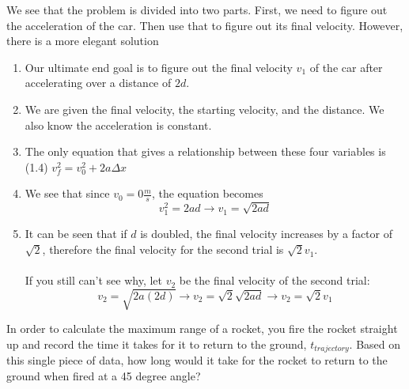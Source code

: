 \begin{solution}
We see that the problem is divided into two parts. First, we need to figure out the acceleration of the car. Then use that to figure out its final velocity. However, there is a more elegant solution
\begin{enumerate}
    \item Our ultimate end goal is to figure out the final velocity $v_1$ of the car after accelerating over a distance of $2d$. 
    \item We are given the final velocity, the starting velocity, and the distance. We also know the acceleration is constant.
    \item The only equation that gives a relationship between these four variables is (1.4) $v_f^2 = v_0^2 + 2a\Delta x$
    \item We see that since $v_0 = 0\frac{m}{s}$, the equation becomes
    \begin{equation*}
        v_1^2 = 2ad \rightarrow
        v_1 = \sqrt{2ad}
    \end{equation*}
    \item It can be seen that if $d$ is doubled, the final velocity increases by a factor of $\sqrt{2}$, therefore the final velocity for the second trial is $\sqrt{2}v_1$. \\\\If you still can't see why, let $v_2$ be the final velocity of the second trial:
    \begin{equation*}
        v_2 = \sqrt{2a(2d)} \rightarrow
        v_2 = \sqrt{2}\sqrt{2ad} \rightarrow
        v_2 = \sqrt{2}v_1
    \end{equation*}
\end{enumerate}
\end{solution}


\begin{question}

In order to calculate the maximum range of a rocket, you fire the rocket straight up and record the time it takes for it to return to the ground, $t_{trajectory}$. Based on this single piece of data, how long would it take for the rocket to return to the ground when fired at a 45 degree angle?

\end{question}

